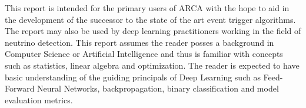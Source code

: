 This report is intended for the primary users of ARCA with the hope to
aid in the development of the successor to the state of the art event
trigger algorithms. The report may also be used by deep learning
practitioners working in the field of neutrino detection. This report
assumes the reader posses a background in Computer Science or
Artificial Intelligence and thus is familiar with concepts such as
statistics, linear algebra and optimization. The reader is expected to
have basic understanding of the guiding principals of Deep Learning
such as Feed-Forward Neural Networks, backpropagation, binary
classification and model evaluation metrics.
